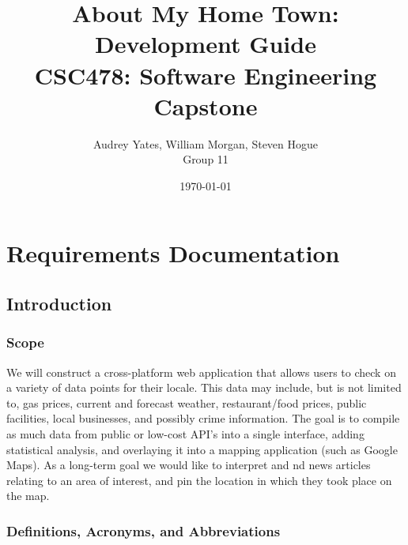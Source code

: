 \documentclass[12pt]{article}
\title{\bf About My Home Town: Development Guide \\ \large CSC478: Software Engineering Capstone}
\author{Audrey Yates, William Morgan, Steven Hogue \\ Group 11}
\date{\today}
\begin{document}
\maketitle

\tableofcontents

\newpage

\section{Requirements Documentation}\label{sec:scope}

\subsection{Introduction}

\subsubsection{Scope}

We will construct a cross-platform web application that allows users to check on a variety of data points for their locale. This data may include, but is not limited to, gas prices, current and forecast weather, restaurant/food prices, public facilities, local businesses, and possibly crime information. The goal is to compile as much data from public or low-cost API's into a single interface, adding statistical analysis, and overlaying it into a mapping application (such as Google Maps). As a long-term goal we would like to interpret and nd news articles relating to an area of interest, and pin the location in which they took place on the map.

\subsubsection{Definitions, Acronyms, and Abbreviations}
\end{document}
